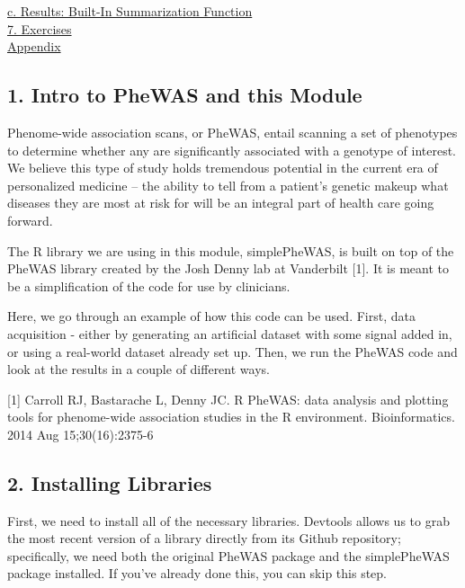 \documentclass{article}
\begin{document}
\hspace*{0.333em}\hspace*{0.333em}\hspace*{0.333em}\hspace*{0.333em}\protect\hyperlink{6c.-Results:-Built-In-Summarization-Function}{c.
Results: Built-In Summarization Function}\\
\protect\hyperlink{7.-Exercises}{7. Exercises}\\
\protect\hyperlink{Appendix:-Converting-ICD-9-Codes-to-PheWAS-Codes}{Appendix}

    \subsection{1. Intro to PheWAS and this
Module}\label{intro-to-phewas-and-this-module}

Phenome-wide association scans, or PheWAS, entail scanning a set of
phenotypes to determine whether any are significantly associated with a
genotype of interest. We believe this type of study holds tremendous
potential in the current era of personalized medicine -- the ability to
tell from a patient's genetic makeup what diseases they are most at risk
for will be an integral part of health care going forward.

The R library we are using in this module, simplePheWAS, is built on top
of the PheWAS library created by the Josh Denny lab at Vanderbilt
{[}1{]}. It is meant to be a simplification of the code for use by
clinicians.

Here, we go through an example of how this code can be used. First, data
acquisition - either by generating an artificial dataset with some
signal added in, or using a real-world dataset already set up. Then, we
run the PheWAS code and look at the results in a couple of different
ways.

{[}1{]} Carroll RJ, Bastarache L, Denny JC. R PheWAS: data analysis and
plotting tools for phenome-wide association studies in the R
environment. Bioinformatics. 2014 Aug 15;30(16):2375-6

    \subsection{2. Installing Libraries}\label{installing-libraries}

First, we need to install all of the necessary libraries. Devtools
allows us to grab the most recent version of a library directly from its
Github repository; specifically, we need both the original PheWAS
package and the simplePheWAS package installed. If you've already done
this, you can skip this step.
\end{document}
